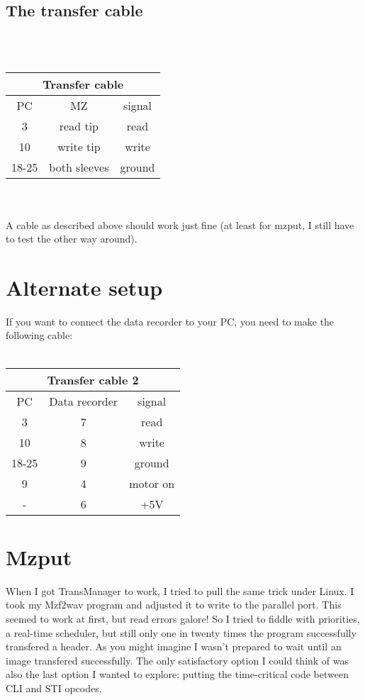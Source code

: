 \subsection{The transfer cable}
 \\ \\
\begin{tabular}{c|c|c}
\multicolumn{3}{c}{Transfer cable} \\
\hline
PC & MZ & signal \\
\hline
3 & read tip & read \\
10 & write tip & write \\
18-25 & both sleeves & ground \\
\end{tabular} \\ \\
A cable as described above should work just fine (at least for mzput, I still
have to test the other way around).

\section{Alternate setup}
If you want to connect the data recorder to your PC, you need to make the 
following cable: \\ \\
\begin{tabular}{c|c|c}
\multicolumn{3}{c}{Transfer cable 2} \\
\hline
PC & Data recorder & signal \\
\hline
3 & 7 & read \\
10 & 8 & write \\
18-25 & 9 & ground \\
9 & 4 & motor on \\
- & 6 & +5V \\
\end{tabular}

\section{Mzput}
When I got TransManager to work, I tried to pull the same trick under Linux. I
took my Mzf2wav program and adjusted it to write to the parallel port. This 
seemed to work at first, but read errors galore! So I tried to fiddle with 
priorities, a real-time scheduler, but still only one in twenty times the
program successfully transfered a header. As you might imagine I wasn't
prepared to wait until an image transfered successfully. The only satisfactory
option I could think of was also the last option I wanted to explore: putting
the time-critical code between CLI and STI opcodes.

